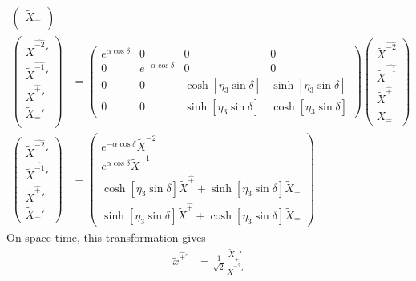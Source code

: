 \documentclass[]{article}
\numberwithin{equation}{section}
\begin{document}
{{\begin{align}
\begin{pmatrix}
    \tilde{X}_{\hat{-}}\\
    \end{pmatrix}\\
    \begin{pmatrix}
    \tilde{X}^{\hat{-2}}'\\
    \tilde{X}^{\hat{-1}}'\\
    \tilde{X}^{\hat{+}}'\\
    \tilde{X}_{\hat{-}}'\\
    \end{pmatrix}&= \begin{pmatrix}
        e^{\alpha \cos{\delta}}&0&0&0\\
        0&e^{-\alpha \cos{\delta}}&0&0\\
        0&0&\cosh{\left[\eta_{3}\sin\delta\right]}&\sinh{\left[\eta_{3}\sin\delta\right]}\\
        0&0&\sinh{\left[\eta_{3}\sin\delta\right]}&\cosh{\left[\eta_{3}\sin\delta\right]}
    \end{pmatrix}\begin{pmatrix}
    \tilde{X}^{\hat{-2}}\\
    \tilde{X}^{\hat{-1}}\\
    \tilde{X}^{\hat{+}}\\
    \tilde{X}_{\hat{-}}
    \end{pmatrix}\\
    \begin{pmatrix}
    \tilde{X}^{\hat{-2}}'\\
    \tilde{X}^{\hat{-1}}'\\
    \tilde{X}^{\hat{+}}'\\
    \tilde{X}_{\hat{-}}'
    \end{pmatrix}&= \begin{pmatrix}
    e^{-\alpha \cos{\delta}}\tilde{X}^{-2}\\
    e^{\alpha \cos{\delta}}\tilde{X}^{-1}\\
    \cosh{\left[\eta_{3}\sin\delta\right]}\tilde{X}^{\hat{+}}+\sinh{\left[\eta_{3}\sin\delta\right]}\tilde{X}_{\hat{-}}\\
    \sinh{\left[\eta_{3}\sin\delta\right]}\tilde{X}^{\hat{+}}+\cosh{\left[\eta_{3}\sin\delta\right]}\tilde{X}_{\hat{-}}
    \end{pmatrix}
\end{align}
On space-time, this transformation gives
\begin{align}
    \tilde{x}^{\hat{+}\prime}&=\frac{1}{\sqrt{2}}\frac{\tilde{X}_{{\hat{+}}}'}{ \tilde{X}^{-2}'}\\

\end{align}}}
\end{document}
